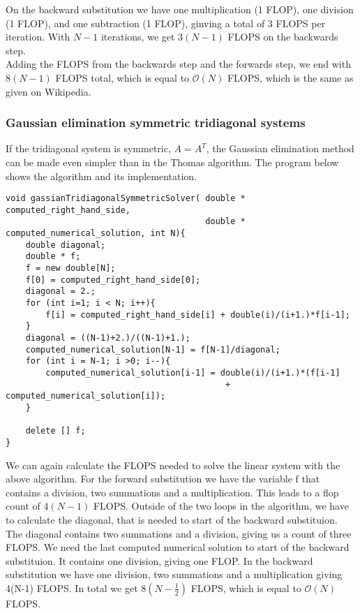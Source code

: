 \documentclass{article}
\begin{document}
On the backward substitution we have one multiplication (1 FLOP), one division (1 FLOP), and one subtraction (1 FLOP), ginving a total of 3 FLOPS per iteration. With $N-1$ iterations, we get $3(N-1)$ FLOPS on the backwards step.\\

Adding the FLOPS from the backwards step and the forwards step, we end with $8(N-1)$ FLOPS total, which is equal to $\mathcal{O}(N)$ FLOPS, which is the same as given on Wikipedia.

\subsubsection{Gaussian elimination symmetric tridiagonal systems}
If the tridiagonal system is symmetric, $A = A^T$, the Gaussian elimination method can be made even simpler than in the Thomas algorithm. The program below shows the algorithm and its implementation.

\begin{lstlisting}
void gassianTridiagonalSymmetricSolver( double * computed_right_hand_side, 
										double * computed_numerical_solution, int N){
    double diagonal;
    double * f;
    f = new double[N];
    f[0] = computed_right_hand_side[0];
    diagonal = 2.;
    for (int i=1; i < N; i++){
        f[i] = computed_right_hand_side[i] + double(i)/(i+1.)*f[i-1];
    }
    diagonal = ((N-1)+2.)/((N-1)+1.);
    computed_numerical_solution[N-1] = f[N-1]/diagonal;
    for (int i = N-1; i >0; i--){
        computed_numerical_solution[i-1] = double(i)/(i+1.)*(f[i-1] 
        									+ computed_numerical_solution[i]);
    }

    delete [] f;
}
\end{lstlisting}

We can again calculate the FLOPS needed to solve the linear system with the above algorithm. For the forward substitution we have the variable f that contains a division, two summations and a multiplication. This leads to a flop count of $4(N-1)$ FLOPS. Outside of the two loops in the algorithm, we have to calculate the diagonal, that is needed to start of the backward substituion. The diagonal contains two summations and a division, giving us a count of three FLOPS. We need the last computed numerical solution to start of the backward substituion. It contains one division, giving one FLOP. In the backward substitution we have one division, two summations and a multiplication giving 4(N-1) FLOPS. In total we get $8(N-\frac{1}{2})$ FLOPS, which is equal to $\mathcal{O}(N)$ FLOPS.\\
\end{document}
